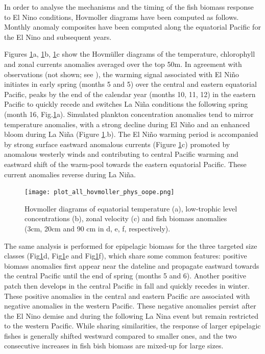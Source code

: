 In order to analyse the mechanisms and the timing of the fish biomass response to El Nino conditions, Hovmoller diagrams have been computed as follows. Monthly anomaly composites have been computed along the equatorial Pacific for the El Nino and subsequent years. 

Figures \ref{fig:hov_nemo_ape}a, \ref{fig:hov_nemo_ape}b, \ref{fig:hov_nemo_ape}c show the  Hovmüller diagrams of the temperature, chlorophyll and zonal currents anomalies averaged over the top 50m. In agreement with observations (not shown; see \cite{lengaigneOceanResponseMarch2002}), the warming signal associated with El Niño initiates in early spring (months 5 and 5) over the central and eastern equatorial Pacific, peaks by the end of the calendar year (months 10, 11, 12) in the eastern Pacific to quickly recede and switches La Niña conditions the following spring (month 16, Fig.\ref{fig:hov_nemo_ape}a). Simulated plankton concentration anomalies tend to mirror temperature anomalies, with a strong decline during El Niño and an enhanced bloom during La Niña (Figure \ref{fig:hov_nemo_ape}.b). 
The El Niño warming period is accompanied by strong surface eastward anomalous currents (Figure \ref{fig:hov_nemo_ape}c) promoted by anomalous westerly winds and contributing to central Pacific warming and eastward shift of the warm-pool towards the eastern equatorial Pacific. These current anomalies reverse during La Niña. 

\begin{figure}[h!tp]
	\centering
	\texttt{[image: plot\_all\_hovmoller\_phys\_oope.png]}	
	\caption{Hovmoller diagrams of equatorial temperature (a), low-trophic level concentrations (b), zonal velocity (c) and fish biomass anomalies (3cm, 20cm and 90 cm in d, e, f, respectively).}	
	\label{fig:hov_nemo_ape}
\end{figure}

The same analysis is performed for epipelagic biomass for the three targeted size classes (Fig\ref{fig:hov_nemo_ape}d, Fig\ref{fig:hov_nemo_ape}e and Fig\ref{fig:hov_nemo_ape}f), which share some common features: positive biomass anomalies first appear near the dateline and propagate eastward towards the central Pacific until the end of spring (months 5 and 6). Another positive patch then develops in the central Pacific in fall and quickly recedes in winter. These positive anomalies in the central and eastern Pacific are associated with negative anomalies in the western Pacific. These negative anomalies persist after the El Nino demise and during the following La Nina event but remain restricted to the western Pacific. While sharing similarities, the response of larger epipelagic fishes is generally shifted westward compared to smaller ones, and the two consecutive increases in fish bish biomass are mixed-up for large sizes.

